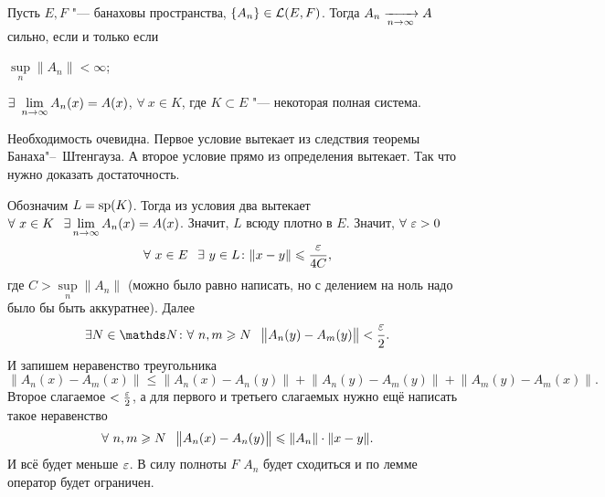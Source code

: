 \begin{The}
  Пусть $E,F$ "--- банаховы пространства, $\{A_n\}\in \mathcal L(E,F)$. Тогда $A_n\xrightarrow[n\rightarrow\infty]{} A$ сильно, если и только если
\begin{roItems}
  \item $\sup\limits_n\|A_n\|<\infty$;
  \item $\exists\ \lim\limits_{n\rightarrow\infty} A_n(x) = A(x)$, $\forall\ x\in K$, где $K\subset E$ "--- некоторая полная система.
\end{roItems}
\end{The}
\begin{Proof}
Необходимость очевидна. Первое условие вытекает из следствия теоремы Банаха"--~Штенгауза. А второе условие прямо из определения вытекает. Так что нужно доказать достаточность.

Обозначим $L = \operatorname{sp}(K)$. Тогда из условия два вытекает $\forall\ x\in K\pau \exists\yo n\infty A_n(x) = A(x)$. Значит, $L$ всюду плотно в $E$. Значит, $\forall\ \varepsilon>0$
\[
  \forall\ x\in E\pau \exists\ y\in L\colon \|x-y\|\le \frac\e{4C},
\]
где $C > \sup\limits_n\|A_n\|$ (можно было равно написать, но с делением на ноль надо было бы быть аккуратнее).
Далее 
\[
  \exists N\in\N\colon \forall\ n,m\ge N\pau \big\|A_n(y) - A_m(y)\big\|<\frac\e2.
\]
И запишем неравенство треугольника
\[
  \big\|A_n(x) - A_m(x)\big\|\le \big\|A_n(x) - A_n(y)\big\| + \big\|A_n(y) - A_m(y)\big\| + \big\|A_m(y) - A_m(x)\big\|.
\]
Второе слагаемое $<\frac{\varepsilon}2$, а для первого и третьего слагаемых нужно ещё написать такое неравенство
\[
  \forall\ n,m\geqslant N\hskip .75em plus.1em minus.08em\relax \big\|A_n(x) - A_n(y)\big\|\leqslant \|A_n\|\cdot \|x-y\|.
\]
И всё будет меньше $\varepsilon$. В силу полноты $F$ $A_n$ будет сходиться и по лемме оператор будет ограничен.
\end{Proof}

